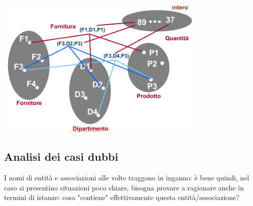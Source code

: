\documentclass[12pt]{article}
\begin{document}
\begin{center}
    \includegraphics[width = 0.75\textwidth]{Images/28.PNG}
\end{center}
\subsection{Analisi dei casi dubbi}
I nomi di entità e associazioni alle volte traggono in inganno: è bene quindi, nel caso si presentino situazioni poco chiare, bisogna provare a ragionare anche in termini di istanze:
cosa "contiene" effettivamente questa entità/associazione?
\end{document}

